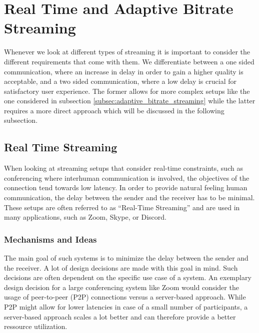 \section{Real Time and Adaptive Bitrate Streaming}\label{sec:rt_and_adaptive_bitrate_streaming}

Whenever we look at different types of streaming it is important to consider the 
different requirements that come with them.
We differentiate between a one sided communication, where an increase in delay 
in order to gain a higher quality is acceptable, and a two sided communication, 
where a low delay is crucial for satisfactory user experience.
The former allows for more complex setups like the one considered in subsection
\nobreakspace\ref{subsec:adaptive_bitrate_streaming} while the latter requires
a more direct approach which will be discussed in the following subsection.

\subsection{Real Time Streaming}
When looking at streaming setups that consider real-time constraints, such as conferencing 
where interhuman communication is involved, the objectives of the connection tend towards
low latency.
In order to provide natural feeling human communication, the delay between the sender 
and the receiver has to be minimal.
These setups are often referred to as ``Real-Time Streaming'' and are used in many 
applications, such as Zoom, Skype, or Discord.

\subsubsection{Mechanisms and Ideas}
The main goal of such systems is to minimize the delay between the sender and the receiver.
A lot of design decisions are made with this goal in mind.
Such decisions are often dependent on the specific use case of a system.
An exemplary design decision for a large conferencing system like Zoom
would consider the usage of peer-to-peer (P2P) connections versus a server-based
approach.
While P2P might allow for lower latencies in case of a small number of participants,
a server-based approach scales a lot better and can therefore provide a better
ressource utilization.

